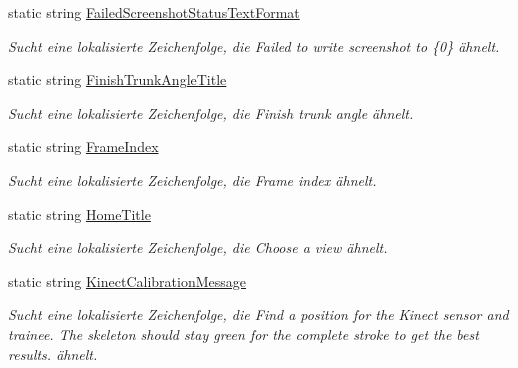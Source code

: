 \begin{DoxyCompactItemize}
static string \hyperlink{class_rowing_monitor_1_1_properties_1_1_resources_a82fbb12913d48de07a02c10dd756b575}{Failed\+Screenshot\+Status\+Text\+Format}
\begin{DoxyCompactList}\small\item\em Sucht eine lokalisierte Zeichenfolge, die Failed to write screenshot to \{0\} ähnelt. \end{DoxyCompactList}\item 
static string \hyperlink{class_rowing_monitor_1_1_properties_1_1_resources_acd7d5d6ec683cf057f592a4376863aaf}{Finish\+Trunk\+Angle\+Title}
\begin{DoxyCompactList}\small\item\em Sucht eine lokalisierte Zeichenfolge, die Finish trunk angle ähnelt. \end{DoxyCompactList}\item 
static string \hyperlink{class_rowing_monitor_1_1_properties_1_1_resources_a63d3b05296e1f16c61a2b7a9d1b3b651}{Frame\+Index}
\begin{DoxyCompactList}\small\item\em Sucht eine lokalisierte Zeichenfolge, die Frame index ähnelt. \end{DoxyCompactList}\item 
static string \hyperlink{class_rowing_monitor_1_1_properties_1_1_resources_af4884ca8ac262911b1fc76c39483a14a}{Home\+Title}
\begin{DoxyCompactList}\small\item\em Sucht eine lokalisierte Zeichenfolge, die Choose a view ähnelt. \end{DoxyCompactList}\item 
static string \hyperlink{class_rowing_monitor_1_1_properties_1_1_resources_a60670c6f75fd3d65281c6341933120b4}{Kinect\+Calibration\+Message}
\begin{DoxyCompactList}\small\item\em Sucht eine lokalisierte Zeichenfolge, die Find a position for the Kinect sensor and trainee. The skeleton should stay green for the complete stroke to get the best results. ähnelt. \end{DoxyCompactList}\item 

\end{DoxyCompactItemize}

